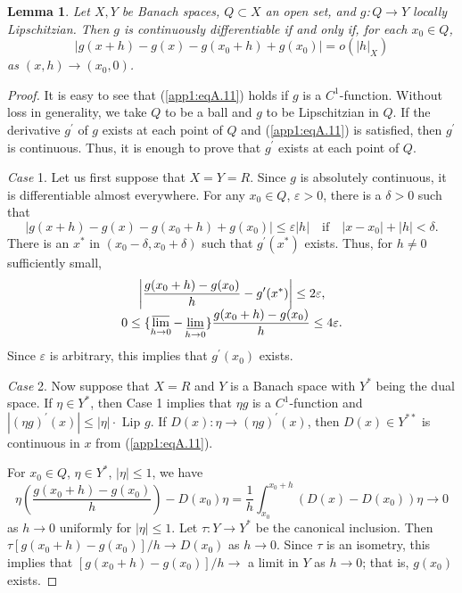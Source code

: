 \documentclass{surv-l}
\theoremstyle{plain}
\newtheorem{lemma}[theorem]{Lemma}
\theoremstyle{definition}
\numberwithin{equation}{section}
\numberwithin{figure}{chapter}
\begin{document}
\begin{lemma}\label{app1:lemA.3}
Let $X,Y$ be Banach spaces, $Q\subset X$ an open set, and $g$:$\,Q\rightarrow Y$ locally Lipschitzian. Then $g$ is continuously differentiable if and only if, for each $x_{0}\in Q$,
\begin{equation}\label{app1:eqA.11}
|g(x+h)-g(x)-g(x_{0}+h)+g(x_{0})|=o(|h|_{X})
\end{equation}
as $(x, h)\rightarrow(x_{0},0)$.
\end{lemma}
\begin{proof}
It is easy to see that (\ref{app1:eqA.11}) holds if $g$ is a $C^{1}$-function. Without loss in generality, we take $Q$ to be a ball and $g$ to be Lipschitzian in $Q$. If the derivative $g^{\prime}$ of $g$ exists at each point of $Q$ and (\ref{app1:eqA.11}) is satisfied, then $g^{\prime}$ is continuous. Thus, it is enough to prove that $g^{\prime}$ exists at each point of $Q$.

\emph{Case} 1. Let us first suppose that $X=Y=R$. Since $g$ is absolutely continuous, it is differentiable almost everywhere. For any $x_{0}\in Q$, $\varepsilon>0$, there is a $\delta >0$ such that
\begin{equation*}
|g(x+h)-g(x)-g(x_{0}+h)+g(x_{0})|\leq\varepsilon|h|\quad\mathrm{if}\quad |x-x_{0}|+|h|<\delta.
\end{equation*}
There is an $x^{\ast}$ in $(x_{0}-\delta, x_{0}+\delta)$ such that $g^{\prime}(x^{\ast})$ exists. Thus, for $h\neq 0$ sufficiently small,
\begin{align*}
\begin{array}{c}
\left|\displaystyle\frac{g(x_{0}+h)-g(x_{0})}{h}-g^{\prime}(x^{\ast})\right|\leq 2\varepsilon,\\
0\leq\{\displaystyle\varlimsup_{h\rightarrow 0}-\displaystyle\varliminf_{h\rightarrow 0}\}\frac{g(x_{0}+h)-g(x_{0})}{h}\leq 4\varepsilon.
\end{array}
\end{align*}
Since $\varepsilon$ is arbitrary, this implies that $g^{\prime}(x_{0})$ exists.

\emph{Case} 2. Now suppose that $X=R$ and $Y$ is a Banach space with $Y^{\ast}$ being the dual space. If $\eta\in Y^{\ast}$, then Case 1 implies that $\eta g$ is a $C^{1}$-function and $|(\eta g)^{\prime}(x)|\leq|\eta|\cdot$ Lip $g$. If $D(x)$:$\,\eta\rightarrow(\eta g)^{\prime}(x)$, then $D(x)\in Y^{**}$ is continuous in $x$ from (\ref{app1:eqA.11}).

For $x_{0}\in Q$, $\eta\in Y^{\ast}$, $|\eta|\leq 1$, we have
\begin{equation*}
\eta\left(\frac{g(x_{0}+h)-g(x_{0})}{h}\right)-D(x_{0})\eta=\frac{1}{h}\int_{x_{0}}^{x_{0}+h}(D(x)-D(x_{0}))\eta\rightarrow 0
\end{equation*}
as $h\rightarrow 0$ uniformly for $|\eta|\leq 1$. Let $\tau$:$\,Y\rightarrow Y^{\ast}$ be the canonical inclusion. Then $\tau[g(x_{0}+h)-g(x_{0})]/h\rightarrow D(x_{0})$ as $h\rightarrow 0$. Since $\tau$ is an isometry, this implies that $[g(x_{0}+h)-g(x_{0})]/h\rightarrow$ a limit in $Y$ as $h\rightarrow 0$; that is, $g(x_{0})$ exists.


\end{proof}
\end{document}
